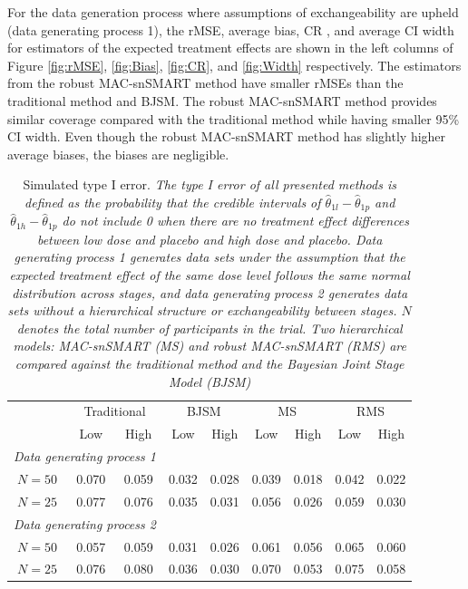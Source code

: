 For the data generation process where assumptions of exchangeability are upheld (data generating process 1), the \ac{rMSE}, average bias,  \ac{CR} , and average \ac{CI} width for estimators of the expected treatment effects are shown in the left columns of Figure \ref{fig:rMSE}, \ref{fig:Bias}, \ref{fig:CR}, and \ref{fig:Width} respectively. The estimators from the robust MAC-snSMART method have smaller \ac{rMSE}s than the traditional method and \ac{BJSM}. The robust MAC-snSMART method provides similar coverage compared with the traditional method while having smaller 95\% \ac{CI} width. Even though the robust MAC-snSMART method has slightly higher average biases, the biases are negligible.
\begin{table} 
\caption{\label{tab:TypeI} \centering Simulated type I error. \protect \linebreak
\small
\textit{The type I error of all presented methods is defined as the probability that the credible intervals of $\widehat{\theta}_{1l} - \widehat{\theta}_{1p}$ and $\widehat{\theta}_{1h} - \widehat{\theta}_{1p}$ do not include 0 when there are no treatment effect differences between low dose and placebo and high dose and placebo. Data generating process 1 generates data sets under the assumption that the expected treatment effect of the same dose level follows the same normal distribution across stages, and data generating process 2 generates data sets without a hierarchical structure or exchangeability between stages. $N$ denotes the total number of participants in the trial. Two hierarchical models: MAC-snSMART (MS) and robust MAC-snSMART (RMS) are compared against the traditional method and the Bayesian Joint Stage Model (BJSM)}}
\centering
\begin{tabular}{ccccccccc}
\hline
\centering \multirow{2}{*}{Sample Size} & \multicolumn{2}{c}{Traditional} & \multicolumn{2}{c}{BJSM} & \multicolumn{2}{c}{MS} & \multicolumn{2}{c}{RMS}\\
\centering  & Low & High & Low & High & Low & High & Low & High \\
\hline
\multicolumn{3}{l}{\textit{Data generating process 1}} &&&& \\
$N = 50$ & 0.070 & 0.059  & 0.032 & 0.028 & 0.039 & 0.018 & 0.042 & 0.022 \\
$N = 25$ & 0.077 & 0.076 & 0.035 & 0.031 & 0.056 & 0.026 & 0.059 & 0.030 \\
\multicolumn{3}{l}{\textit{Data generating process 2}} &&&& \\
$N = 50$ & 0.057 & 0.059 & 0.031 & 0.026 & 0.061 & 0.056 & 0.065 & 0.060 \\
$N = 25$ & 0.076 & 0.080 & 0.036 & 0.030 & 0.070 & 0.053 & 0.075 & 0.058\\
\hline
\end{tabular}
\end{table}

